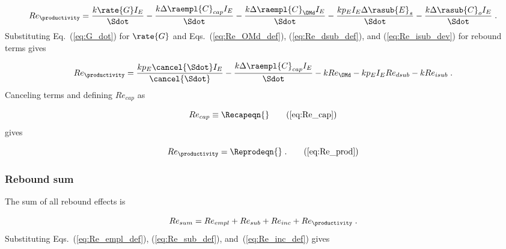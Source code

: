\begin{equation}
  Re_{\productivity} = \frac{k \rate{G} I_E}{\Sdot}
                                - \frac{k \Delta \raempl{C}_{cap} I_E}{\Sdot}
                                - \frac{k \Delta \raempl{C}_{\OMd} I_E}{\Sdot}
                                - \frac{k p_E I_E \Delta \rasub{E}_s}{\Sdot}
                                - \frac{k \Delta \rasub{C}_o I_E}{\Sdot} \; .
\end{equation}
%
Substituting Eq.~(\ref{eq:G_dot}) for $\rate{G}$
and Eqs.~(\ref{eq:Re_OMd_def}), (\ref{eq:Re_dsub_def}), and (\ref{eq:Re_isub_dev})
for rebound terms gives

\begin{equation}
  Re_{\productivity} = \frac{k p_E \cancel{\Sdot} I_E}{\cancel{\Sdot}}
                                - \frac{k \Delta \raempl{C}_{cap} I_E}{\Sdot}
                                - k Re_{\OMd}
                                - k p_E I_E Re_{dsub}
                                - k Re_{isub} \; .
\end{equation}
%
Canceling terms and defining $Re_{cap}$ as

\begin{equation}
  Re_{cap} \equiv \Recapeqn{}  \tag{\ref{eq:Re_cap}}
\end{equation}
%
gives

% 

\begin{equation}
  Re_{\productivity} = \Reprodeqn{} \; . \tag{\ref{eq:Re_prod}}
\end{equation}


\subsubsection{Rebound sum} 
\label{sec:total_rebound}

The sum of all rebound effects is 

\begin{equation}
  Re_{sum} = Re_{empl} + Re_{sub} + Re_{inc} + Re_{\productivity} \; .
\end{equation}
%
Substituting Eqs.~(\ref{eq:Re_empl_def}), (\ref{eq:Re_sub_def}), and~(\ref{eq:Re_inc_def}) gives

